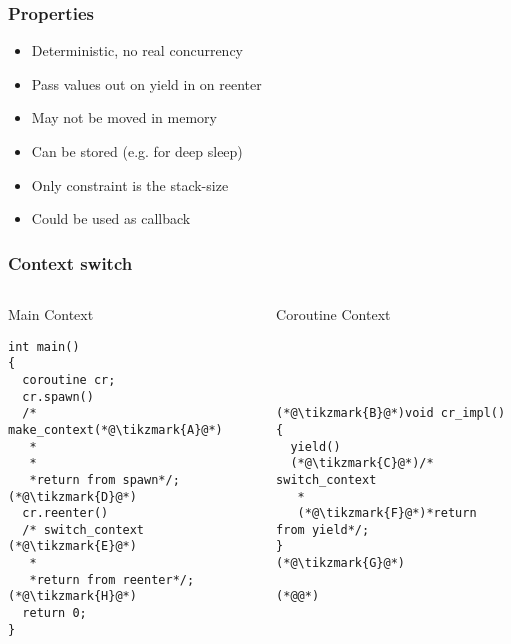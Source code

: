 \documentclass{beamer}
\def\tikzmark#1{\tikz[remember picture,overlay]\node[yshift=2pt](#1){};}
\begin{document}
\begin{frame}
\frametitle{Properties}
\begin{itemize}
\item<1-> Deterministic, no real concurrency
\item<2-> Pass values out on yield in on reenter
\item<3-> May not be moved in memory
\item<4-> Can be stored (e.g. for deep sleep)
\item<5-> Only constraint is the stack-size
\item<6-> Could be used as callback
\end{itemize}
\end{frame}



\begin{frame}[fragile]
\frametitle{Context switch}
\begin{columns}
\begin{column}{0.49\textwidth}
Main Context
\begin{block}{}
\begin{lstlisting}[basicstyle=\small]
int main()
{
  coroutine cr;
  cr.spawn()
  /* make_context(*@\tikzmark{A}@*)
   *
   * 
   *return from spawn*/;(*@\tikzmark{D}@*)
  cr.reenter()
  /* switch_context (*@\tikzmark{E}@*)
   *
   *return from reenter*/;(*@\tikzmark{H}@*)
  return 0;
}
\end{lstlisting}
\end{block}
\end{column}
\begin{column}{0.49\textwidth}
Coroutine Context

\begin{block}{}
\begin{lstlisting}[basicstyle=\small, numbers=right]




(*@\tikzmark{B}@*)void cr_impl()
{
  yield()
  (*@\tikzmark{C}@*)/* switch_context
   *
   (*@\tikzmark{F}@*)*return from yield*/;
}
(*@\tikzmark{G}@*)

(*@@*)  
\end{lstlisting}
\end{block}
\end{column}
\end{columns}


\end{frame}
\end{document}

